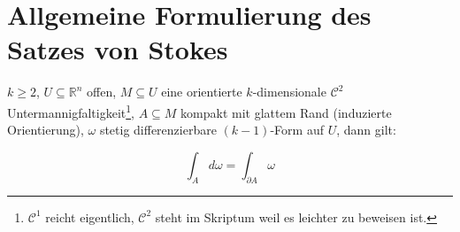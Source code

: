 \section{Allgemeine Formulierung des Satzes von Stokes}
\begin{theorem}
	$k\geq 2$, $U\subseteq\mathbb R^n$ offen, $M\subseteq U$ eine orientierte $k$-dimensionale $\mathcal C^2$ Untermannigfaltigkeit\footnote{$\mathcal C^1$ reicht eigentlich, $\mathcal C^2$ steht im Skriptum weil es leichter zu beweisen ist.}, $A\subseteq M$ kompakt mit glattem Rand (induzierte Orientierung), $\omega$ stetig differenzierbare $(k-1)$-Form auf $U$, dann gilt:
	
	$$\int_A d\omega = \int_{\partial A} \omega$$
\end{theorem}















